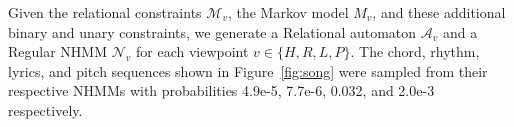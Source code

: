 \documentclass[phd,electronic,oneside,twosidetoc,letterpaper,chaptercenter,parttop,lol,lof,lot]{byumsphd}
\begin{document}
Given the relational constraints $\mathcal{M}_v$, the Markov model $M_v$, and these additional binary and unary constraints, we generate a {\sc Relational} automaton $\mathcal{A}_v$ and a {\sc Regular} NHMM $\mathcal{N}_v$ for each viewpoint $v\in\{H,R,L,P\}$. The chord, rhythm, lyrics, and pitch sequences shown in Figure~\ref{fig:song} were sampled from their respective NHMMs with probabilities 4.9e-5, 7.7e-6, 0.032, and 2.0e-3 respectively.

%
%
%
%
\end{document}
